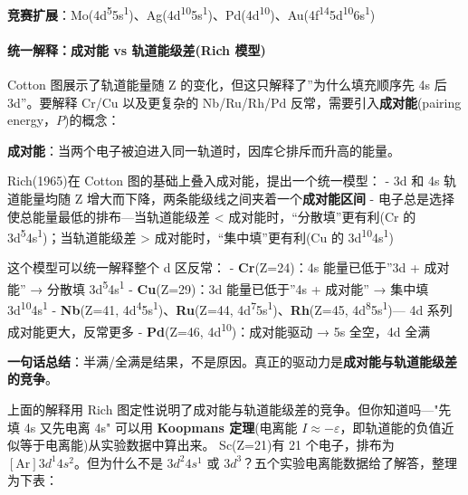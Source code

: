 \textbf{竞赛扩展}：Mo(4d\textsuperscript{5}5s\textsuperscript{1})、Ag(4d\textsuperscript{10}5s\textsuperscript{1})、Pd(4d\textsuperscript{10})、Au(4f\textsuperscript{14}5d\textsuperscript{10}6s\textsuperscript{1})

\paragraph{统一解释：成对能 vs 轨道能级差(Rich 模型)}\label{ux7edfux4e00ux89e3ux91caux6210ux5bf9ux80fd-vs-ux8f68ux9053ux80fdux7ea7ux5deerich-ux6a21ux578b}

Cotton 图展示了轨道能量随 Z 的变化，但这只解释了''为什么填充顺序先 4s 后 3d''。要解释 Cr/Cu 以及更复杂的 Nb/Ru/Rh/Pd 反常，需要引入\textbf{成对能}(pairing energy，\(P\))的概念：

\textbf{成对能}：当两个电子被迫进入同一轨道时，因库仑排斥而升高的能量。

Rich(1965)在 Cotton 图的基础上叠入成对能，提出一个统一模型：
- 3d 和 4s 轨道能量均随 Z 增大而下降，两条能级线之间夹着一个\textbf{成对能区间}
- 电子总是选择使总能量最低的排布---当轨道能级差 \textless{} 成对能时，``分散填''更有利(Cr 的 3d\textsuperscript{5}4s\textsuperscript{1})；当轨道能级差 \textgreater{} 成对能时，``集中填''更有利(Cu 的 3d\textsuperscript{10}4s\textsuperscript{1})

这个模型可以统一解释整个 d 区反常：
- \textbf{Cr}(Z=24)：4s 能量已低于''3d + 成对能'' → 分散填 3d\textsuperscript{5}4s\textsuperscript{1}
- \textbf{Cu}(Z=29)：3d 能量已低于''4s + 成对能'' → 集中填 3d\textsuperscript{10}4s\textsuperscript{1}
- \textbf{Nb}(Z=41, 4d\textsuperscript{4}5s\textsuperscript{1})、\textbf{Ru}(Z=44, 4d\textsuperscript{7}5s\textsuperscript{1})、\textbf{Rh}(Z=45, 4d\textsuperscript{8}5s\textsuperscript{1})--- 4d 系列成对能更大，反常更多
- \textbf{Pd}(Z=46, 4d\textsuperscript{10})：成对能驱动 → 5s 全空，4d 全满

\textbf{一句话总结}：半满/全满是结果，不是原因。真正的驱动力是\textbf{成对能与轨道能级差的竞争}。

上面的解释用 Rich 图定性说明了成对能与轨道能级差的竞争。但你知道吗---"先填 4s 又先电离 4s" 可以用 \textbf{Koopmans 定理}(电离能 \(I \approx -\varepsilon\)，即轨道能的负值近似等于电离能)从实验数据中算出来。
Sc(Z=21)有 21 个电子，排布为 \([\mathrm{Ar}]3d^1 4s^2\)。但为什么不是 \(3d^2 4s^1\) 或 \(3d^3\)？五个实验电离能数据给了解答，整理为下表：

